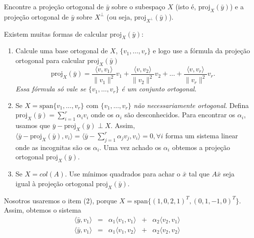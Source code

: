 \documentclass[11pt]{exam}
\begin{document}
\begin{questions}
\begin{parts}
      Encontre a projeção ortogonal de 
      $\bar{y}$ sobre o subespaço $X$ (isto é, $\text{proj}_{X}(\bar{y})$) e 
      a projeção ortogonal de $\bar{y}$ sobre $X^{\perp}$
      (ou seja, $\text{proj}_{X^{\perp}}(\bar{y})$).
         \begin{solution}
          Existem muitas formas de calcular $\text{proj}_{X}(\bar{y})$:
            \begin{enumerate}
             \item Calcule uma base ortogonal de $X$, $\{v_1, \dots, v_{r}\}$
             e logo use a fórmula da projeção ortogonal para calcular $\text{proj}_{X}(\bar{y})$
              $$ \text{proj}_{X}(\bar{y})= \frac{\langle v, v_1 \rangle}{\|v_1\|^2} v_{1}+
                          \frac{\langle v, v_2 \rangle}{\|v_2\|^2} v_{2}+
                          \dots+
                          \frac{\langle v, v_r \rangle}{\|v_r\|^2} v_{r}. $$ 
             {\it Essa fórmula só vale se $\{v_1, \dots, v_{r}\}$ é um conjunto ortogonal}.
             \item Se $X=\text{span}\{v_1,\dots,v_r\}$ com $\{v_1, \dots, v_{r}\}$
             {\it não necessariamente ortogonal}. Defina $\text{proj}_{X}(\bar{y})=\sum_{i=1}^{r} \alpha_{i} v_{i}$
             onde os $\alpha_i$ são desconhecidos. Para encontrar os $\alpha_i$, 
             usamos que $\bar{y}-\text{proj}_{X}(\bar{y}) \perp X$. 
             Assim, 
             $ \langle \bar{y}-\text{proj}_{X}(\bar{y}), v_{i}\rangle=
               \langle \bar{y}-\sum_{j=1}^{r} \alpha_{j} v_{j}, v_{i}\rangle=0, \forall i$
               forma um sistema linear onde as incognitas são os $\alpha_i$. Uma vez achado os $\alpha_i$
               obtemos a projeção ortogonal $\text{proj}_{X}(\bar{y})$.
             \item Se $X=col(A)$. Use mínimos quadrados para achar o $\bar{x}$ tal que $A\bar{x}$ seja igual à
            projeção ortogonal $\text{proj}_{X}(\bar{y})$.
            \end{enumerate}
         Nosotros usaremos o item (2), porque $X=\text{span} \{(1, 0, 2, 1)^{T}, (0, 1, -1, 0)^{T}\}$. Assim, obtemos o sistema
         $$
         \begin{matrix}
           \langle \bar{y}, v_1 \rangle&=& \alpha_1 \langle v_1, v_1 \rangle &+& \alpha_2 \langle v_2, v_1 \rangle \\
           \langle \bar{y}, v_1 \rangle&=& \alpha_1 \langle v_1, v_2 \rangle &+& \alpha_2 \langle v_2, v_2 \rangle
         \end{matrix}
         $$

\end{solution}
\end{parts}
\end{questions}
\end{document}
